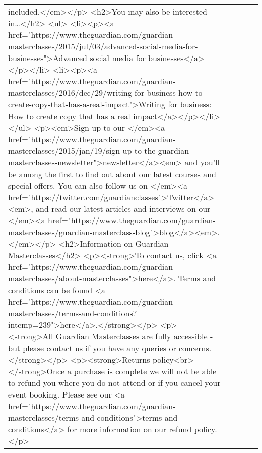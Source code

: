 \documentclass[]{article}
\begin{document}
\begin{table}[!h]
{\begin{tabular}[t]{lllll}
included.</em></p> <h2>You may also be interested in…</h2> <ul> <li><p><a href="https://www.theguardian.com/guardian-masterclasses/2015/jul/03/advanced-social-media-for-businesses">Advanced social media for businesses</a></p></li> <li><p><a href="https://www.theguardian.com/guardian-masterclasses/2016/dec/29/writing-for-business-how-to-create-copy-that-has-a-real-impact">Writing for business: How to create copy that has a real impact</a></p></li> </ul> <p><em>Sign up to our </em><a href="https://www.theguardian.com/guardian-masterclasses/2015/jan/19/sign-up-to-the-guardian-masterclasses-newsletter">newsletter</a><em> and you’ll be among the first to find out about our latest courses and special offers. You can also follow us on </em><a href="https://twitter.com/guardianclasses">Twitter</a><em>, and read our latest articles and interviews on our </em><a href="https://www.theguardian.com/guardian-masterclasses/guardian-masterclass-blog">blog</a><em>.</em></p> <h2>Information on Guardian Masterclasses</h2> <p><strong>To contact us, click <a href="https://www.theguardian.com/guardian-masterclasses/about-masterclasses">here</a>. Terms and conditions can be found <a href="https://www.theguardian.com/guardian-masterclasses/terms-and-conditions?intcmp=239">here</a>.</strong></p> <p><strong>All Guardian Masterclasses are fully accessible - but please contact us if you have any queries or concerns.</strong></p> <p><strong>Returns policy<br></strong>Once a purchase is complete we will not be able to refund you where you do not attend or if you cancel your event booking. Please see our <a href="https://www.theguardian.com/guardian-masterclasses/terms-and-conditions">terms and conditions</a> for more information on our refund policy.</p>\\

\end{tabular}}
\end{table}
\end{document}
